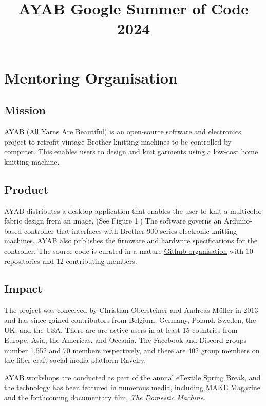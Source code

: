 \documentclass{article}
\title{AYAB Google Summer of Code 2024}
\author{\color{red}{\textbf{Application Deadline: Feb 6, 2024}}}
\begin{document}
\maketitle

\section{Mentoring Organisation}

\subsection{Mission}

\href{https://ayab-knitting.com/}{AYAB} (All Yarns Are Beautiful) is an open-source software and electronics project to retrofit vintage Brother knitting machines to be controlled by computer. This enables users to design and knit garments using a low-cost home knitting machine.

\subsection{Product}

AYAB distributes a desktop application that enables the user to knit a multicolor fabric design from an image. (See Figure 1.) The software governs an Arduino-based controller that interfaces with Brother 900-series electronic knitting machines. AYAB also publishes the firmware and hardware specifications for the controller. The source code is curated in a mature \href{https://github.com/AllYarnsAreBeautiful}{Github organisation} with 10 repositories and 12 contributing members.

\subsection{Impact}

The project was conceived by Christian Obersteiner and Andreas M{\"u}ller in 2013 and has since gained contributors from Belgium, Germany, Poland, Sweden, the UK, and the USA. There are are active users in at least 15 countries from Europe, Asia, the Americas, and Oceania. The Facebook and Discord groups number 1,552 and 70 members respectively, and there are 402 group members on the fiber craft social media platform Ravelry.

AYAB workshops are conducted as part of the annual \href{http://etextilespringbreak.org/}{eTextile Spring Break}, and the technology has been featured in numerous media, including MAKE Magazine and the forthcoming documentary film, \href{https://www.thedomesticmachine.com/}{\textit{The Domestic Machine}.}
\end{document}
